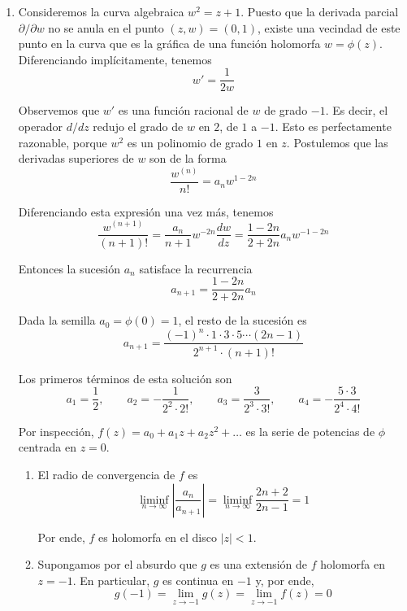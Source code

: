 \begin{solution}
\leavevmode
\begin{enumerate}[label=\alph*)]
    \item Consideremos la curva algebraica $w^2 = z + 1$. Puesto que la derivada parcial $\partial / \partial w$ no se anula en el punto $(z, w) = (0, 1)$, existe una vecindad de este punto en la curva que es la gráfica de una función holomorfa $w = \phi(z)$. Diferenciando implícitamente, tenemos
    $$w' = \frac 1 {2w}$$
    
    Observemos que $w'$ es una función racional de $w$ de grado $-1$. Es decir, el operador $d/dz$ redujo el grado de $w$ en $2$, de $1$ a $-1$. Esto es perfectamente razonable, porque $w^2$ es un polinomio de grado $1$ en $z$. Postulemos que las derivadas superiores de $w$ son de la forma
    $$\frac {w^{(n)}} {n!} = a_n w^{1-2n}$$
    
    Diferenciando esta expresión una vez más, tenemos
    $$
    \frac {w^{(n+1)}} {(n+1)!}
        = \frac {a_n} {n+1} w^{-2n} \frac {dw} {dz}
        = \frac {1 - 2n} {2 + 2n} a_n w^{-1-2n}
    $$
    
    Entonces la sucesión $a_n$ satisface la recurrencia
    $$a_{n+1} = \frac {1 - 2n} {2 + 2n} a_n$$
    
    Dada la semilla $a_0 = \phi(0) = 1$, el resto de la sucesión es
    $$a_{n+1} = \frac {(-1)^n \cdot 1 \cdot 3 \cdot 5 \cdots (2n - 1)} {2^{n+1} \cdot (n+1)!}$$
    
    Los primeros términos de esta solución son
    $$a_1 = \frac 12, \qquad a_2 = -\frac 1 {2^2 \cdot 2!}, \qquad a_3 = \frac 3 {2^3 \cdot 3!}, \qquad a_4 = -\frac {5 \cdot 3} {2^4 \cdot 4!}$$
    
    Por inspección, $f(z) = a_0 + a_1 z + a_2 z^2 + \dots$ es la serie de potencias de $\phi$ centrada en $z = 0$.
    
    \begin{enumerate}[label=\arabic*)]
        \item El radio de convergencia de $f$ es
        $$\liminf_{n \to \infty} \left| \frac {a_n} {a_{n+1}} \right| = \liminf_{n \to \infty} \frac {2n + 2} {2n - 1} = 1$$
        
        Por ende, $f$ es holomorfa en el disco $|z| < 1$.
        
        \item Supongamos por el absurdo que $g$ es una extensión de $f$ holomorfa en $z = -1$. En particular, $g$ es continua en $-1$ y, por ende,
        $$g(-1) = \lim_{z \to -1} g(z) = \lim_{z \to -1} f(z) = 0$$
        

\end{enumerate}
\end{enumerate}
\end{solution}

